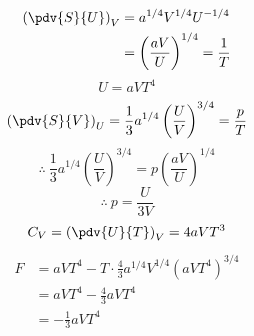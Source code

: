 \begin{align*}
\left(\pdv{S}{U}\right)_{V}&=a^{1/4}V^{1/4}U^{-1/4}\\
&=\left(\frac{aV}{U}\right)^{1/4}=\frac{1}{T}
\end{align*}
\[ U=aVT^{4} \]
\[ \left(\pdv{S}{V}\right)_{U}=\frac{1}{3}a^{1/4}\left(\frac{U}{V}\right)^{3/4}=\frac{p}{T} \]
\[ \therefore\ \frac{1}{3}a^{1/4}\left(\frac{U}{V}\right)^{3/4}=p\left(\frac{aV}{U}\right)^{1/4} \]
\[ \therefore\ p=\frac{U}{3V} \]
\[ C_{V}=\left(\pdv{U}{T}\right)_{V}=4aVT^{3} \]
\begin{align*}
F&=aVT^{4}-T\cdot\frac{4}{3}a^{1/4}V^{1/4}\left(aVT^{4}\right)^{3/4}\\
&=aVT^{4}-\frac{4}{3}aVT^{4}\\
&=-\frac{1}{3}aVT^{4}
\end{align*}
